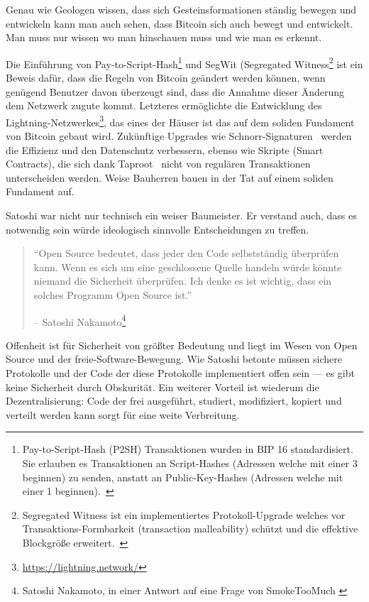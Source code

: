 Genau wie Geologen wissen, dass sich Gesteinsformationen ständig bewegen und
entwickeln kann man auch sehen, dass Bitcoin sich auch bewegt und entwickelt.
Man muss nur wissen wo man hinschauen muss und wie man es erkennt.

Die Einführung von Pay-to-Script-Hash\footnote{Pay-to-Script-Hash (P2SH)
Transaktionen wurden in BIP 16 standardisiert. Sie erlauben es Transaktionen an
Script-Hashes (Adressen welche mit einer 3 beginnen) zu senden, anstatt an
Public-Key-Hashes (Adressen welche mit einer 1 beginnen).~\cite{btcwiki:p2sh}}
und SegWit (Segregated Witness\footnote{Segregated Witness  ist ein
implementiertes Protokoll-Upgrade welches vor Transaktions-Formbarkeit
(transaction malleability) schützt und die effektive Blockgröße
erweitert.~\cite{btcwiki:segwit}} ist ein Beweis dafür, dass die Regeln von
Bitcoin geändert werden können, wenn genügend Benutzer davon überzeugt sind,
dass die Annahme dieser Änderung dem Netzwerk zugute kommt. Letzteres
ermöglichte die Entwicklung des
Lightning-Netzwerkes\footnote{\url{https://lightning.network/}}, das eines der
Häuser ist das auf dem soliden Fundament von Bitcoin gebaut wird. Zukünftige
Upgrades wie Schnorr-Signaturen~\cite{bip:schnorr} werden die Effizienz und den
Datenschutz verbessern, ebenso wie Skripte (Smart Contracts), die sich dank
Taproot~\cite{taproot} nicht von regulären Transaktionen unterscheiden werden.
Weise Bauherren bauen in der Tat auf einem soliden Fundament auf.

Satoshi war nicht nur technisch ein weiser Baumeister. Er verstand auch, dass es
notwendig sein würde ideologisch sinnvolle Entscheidungen zu treffen.

\begin{quotation}\begin{samepage}
\enquote{Open Source bedeutet, dass jeder den Code selbstständig überprüfen
kann. Wenn es sich um eine geschlossene Quelle handeln würde könnte niemand die
Sicherheit überprüfen. Ich denke es ist wichtig, dass ein solches Programm Open
Source ist.}
\begin{flushright} -- Satoshi Nakamoto\footnote{Satoshi Nakamoto, in einer
Antwort auf eine Frage von SmokeTooMuch \cite{satoshi-open-source}}
\end{flushright}\end{samepage}\end{quotation}

Offenheit ist für Sicherheit von größter Bedeutung und liegt im Wesen von Open
Source und der freie-Software-Bewegung. Wie Satoshi betonte müssen sichere
Protokolle und der Code der diese Protokolle implementiert offen sein --- es
gibt keine Sicherheit durch Obskurität. Ein weiterer Vorteil ist wiederum die
Dezentralisierung: Code der frei ausgeführt, studiert, modifiziert, kopiert und
verteilt werden kann sorgt für eine weite Verbreitung.

